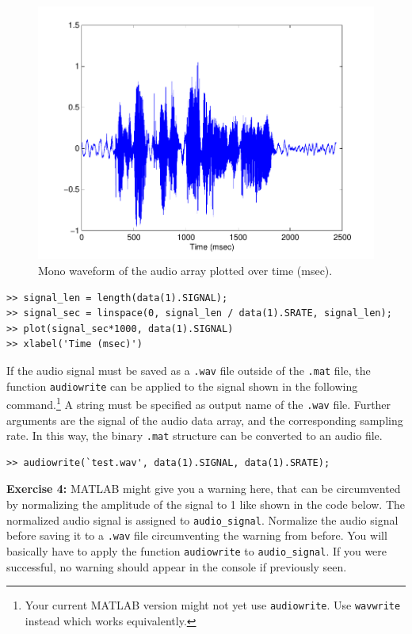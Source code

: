 \documentclass[a4paper, 12pt]{article}
\begin{document}
\setlength\intextsep{-20pt}
\begin{figure}
\includegraphics[scale=0.45]{wavems.pdf}%
\caption{Mono waveform of the audio array plotted over time (msec).}\label{fig:wavems}
\end{figure}



\begin{verbatim}
>> signal_len = length(data(1).SIGNAL);
>> signal_sec = linspace(0, signal_len / data(1).SRATE, signal_len);
>> plot(signal_sec*1000, data(1).SIGNAL)
>> xlabel('Time (msec)')
\end{verbatim}


If the audio signal must be saved as a \texttt{.wav} file outside of the \texttt{.mat} file, the function \texttt{audiowrite} can be applied to the signal shown in the following command.\footnote{Your current MATLAB version might not yet use \texttt{audiowrite}. Use \texttt{wavwrite} instead which works equivalently.} A string must be specified as output name of the \texttt{.wav} file. Further arguments are the signal of the audio data array, and the corresponding sampling rate. In this way, the binary \texttt{.mat} structure can be converted to an audio file. 

\begin{verbatim}
>> audiowrite(`test.wav', data(1).SIGNAL, data(1).SRATE);
\end{verbatim}

\noindent\textbf{Exercise 4:} MATLAB might give you a warning here, that can be circumvented by normalizing the amplitude of the signal to 1 like shown in the code below. The normalized audio signal is assigned to \texttt{audio\_signal}. Normalize the audio signal before saving it to a \texttt{.wav} file circumventing the warning from before. You will basically have to apply the function \texttt{audiowrite} to \texttt{audio\_signal}. If you were successful, no warning should appear in the console if previously seen.\par\smallskip
\end{document}
